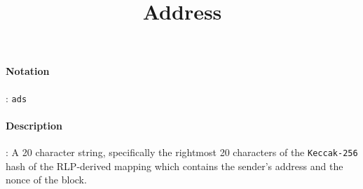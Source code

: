 \documentclass[10pt,a4paper,oneside]{scrartcl}
\author{}
\title{Address}
\date{}
\begin{document}
\maketitle
\paragraph{Notation}: \texttt{ads}
\paragraph{Description}: A 20 character string, specifically the rightmost 20 characters of the \texttt{Keccak-256} hash of the RLP-derived mapping which contains the sender's address and the nonce of the block.   
\end{document}
